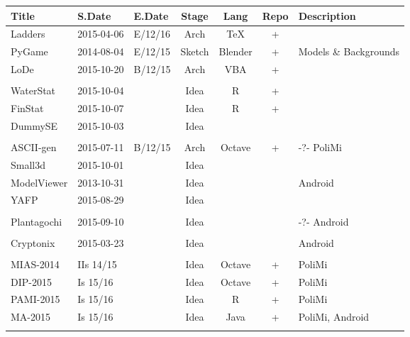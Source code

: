\documentclass[a4paper,12pt]{article} %
\begin{document}
	
\begin{tabularx}{\textwidth}{|l|l|l|c|c|c|X|}
	\hline
	Title & S.Date & E.Date & Stage & Lang & Repo & Description \\
	\hline
	Ladders & 2015-04-06 & E/12/16 & Arch & \TeX & + &  \\
	\hline
	PyGame & 2014-08-04 & E/12/15 & Sketch & Blender & + & Models \& Backgrounds \\
	\hline
	LoDe & 2015-10-20 & B/12/15 & Arch & VBA & + &  \\
	\hline
	&  &  &  &  &  &  \\
	\hline
	WaterStat & 2015-10-04 &  & Idea & R & + &  \\
	\hline
	FinStat & 2015-10-07 &  & Idea & R & + &  \\
	\hline
	DummySE & 2015-10-03 &  & Idea &  &  &  \\
	\hline
	&  &  &  &  &  &  \\
	\hline
	ASCII-gen & 2015-07-11 & B/12/15 & Arch & Octave & + & -?- PoliMi \\
	\hline
	Small3d & 2015-10-01 &  & Idea &  &  &  \\
	\hline
	ModelViewer & 2013-10-31 &  & Idea &  &  & Android \\
	\hline
	YAFP & 2015-08-29 &  & Idea &  &  &  \\
	\hline
	&  &  &  &  &  &  \\
	\hline
	Plantagochi & 2015-09-10 &  & Idea &  &  & -?- Android \\
	\hline
	&  &  &  &  &  &  \\
	\hline
	Cryptonix & 2015-03-23 &  & Idea &  &  & Android \\
	\hline
	&  &  &  &  &  &  \\
	\hline
	MIAS-2014 & IIs 14/15 &  & Idea & Octave & + & PoliMi \\
	\hline
	DIP-2015 & Is 15/16 &  & Idea & Octave & + & PoliMi \\
	\hline
	PAMI-2015 & Is 15/16 &  & Idea & R & + & PoliMi \\
	\hline
	MA-2015 & Is 15/16 &  & Idea & Java & + & PoliMi, Android \\
	\hline
	&  &  &  &  &  &  \\
	\hline
\end{tabularx}

\end{document}
